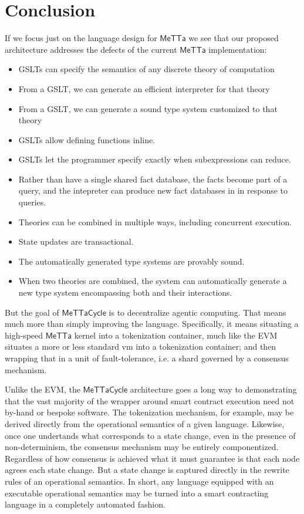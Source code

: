 \documentclass{article}
\newcommand{\MC}{\mathsf{MeTTaCycle}}
\begin{document}
\section{Conclusion}

If we focus just on the language design for $\mathsf{MeTTa}$ we see
that our proposed architecture addresses the defects of the current
$\mathsf{MeTTa}$ implementation:

\begin{itemize}
    \item GSLTs can specify the semantics of any discrete theory of computation
    \item From a GSLT, we can generate an efficient interpreter for that theory
    \item From a GSLT, we can generate a sound type system customized to that theory
    \item GSLTs allow defining functions inline.
    \item GSLTs let the programmer specify exactly when subexpressions can reduce.
    \item Rather than have a single shared fact database, the facts become part of a query, and the intepreter can produce new fact databases in in response to queries.
    \item Theories can be combined in multiple ways, including concurrent execution.
    \item State updates are transactional.
    \item The automatically generated type systems are provably sound.
    \item When two theories are combined, the system can automatically generate a new type system encompassing both and their interactions.
\end{itemize}

But the goal of $\MC$ is to decentralize agentic computing. That means
much more than simply improving the language. Specifically, it means
situating a high-speed $\mathsf{MeTTa}$ kernel into a tokenization
container, much like the EVM situates a more or less standard vm into
a tokenization container; and then wrapping that in a unit of
fault-tolerance, i.e. a shard governed by a consensus mechanism.

Unlike the EVM, the $\MC$ architecture goes a long way to
demonstrating that the vast majority of the wrapper around smart
contract execution need not by-hand or bespoke software. The
tokenization mechanism, for example, may be derived directly from the
operational semantics of a given language. Likewise, once one
undertands what corresponds to a state change, even in the presence of
non-determinism, the consensus mechanism may be entirely
componentized. Regardless of how consensus is achieved what it must
guarantee is that each node agrees each state change. But a state
change is captured directly in the rewrite rules of an operational
semantics. In short, any language equipped with an executable
operational semantics may be turned into a smart contracting language
in a completely automated fashion.
\end{document}
